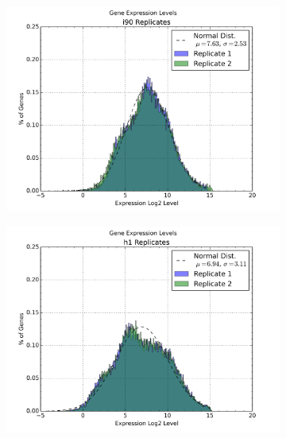 \begin{figure}
  \centering

  \begin{subfigure}[b]{0.45\textwidth}
    \centering
    \includegraphics[width=\textwidth]{./fig/supplementary/i90-expression-levels.png}\label{fig:190Expression}
  \end{subfigure}

  \hfill

  \begin{subfigure}[b]{0.45\textwidth}
    \includegraphics[width=\textwidth]{./fig/supplementary/h1-expression-levels.png}\label{fig:h1expression}
  \end{subfigure}


\end{figure}

